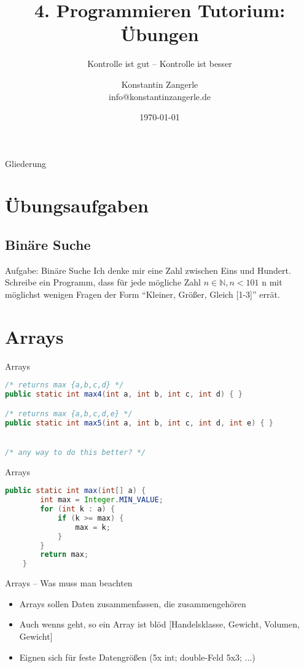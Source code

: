 \documentclass[18pt]{beamer}
\title[Programmieren Tutorium]{4. Programmieren Tutorium:\\ Übungen}
\subtitle{Kontrolle ist gut – Kontrolle ist besser}
\author{Konstantin Zangerle \\ info@konstantinzangerle.de}
\date{\today}
\begin{document}

\begin{frame}
\titlepage
\end{frame}

\begin{frame}{Gliederung}
\tableofcontents
\end{frame}

\section{Übungsaufgaben}
\subsection{Binäre Suche}
\begin{frame}{Aufgabe: Binäre Suche}
Ich denke mir eine Zahl zwischen Eins und Hundert. Schreibe ein Programm, 
dass für jede mögliche Zahl $n \in \mathbb{N}, n <101$ n mit möglichst 
wenigen Fragen der Form ``Kleiner, Größer, Gleich [1-3]'' errät.
\end{frame}



\section{Arrays} %
\begin{frame}[fragile]{Arrays}
\begin{lstlisting}[language=java]
/* returns max {a,b,c,d} */
public static int max4(int a, int b, int c, int d) { } 

/* returns max {a,b,c,d,e} */
public static int max5(int a, int b, int c, int d, int e) { } 


/* any way to do this better? */
\end{lstlisting}
\end{frame}

\begin{frame}[fragile]{Arrays}
 \begin{lstlisting}[language=java]
    public static int max(int[] a) {
        int max = Integer.MIN_VALUE;
        for (int k : a) {
            if (k >= max) {
                max = k;
            }
        }
        return max;
    }
 \end{lstlisting}
\end{frame}

\begin{frame}{Arrays – Was muss man beachten}
 \begin{itemize}
  \item Arrays sollen Daten zusammenfassen, die zusammengehören
  \item Auch wenns geht, so ein Array ist blöd [Handelsklasse, Gewicht, Volumen, Gewicht]
  \item Eignen sich für feste Datengrößen (5x int; double-Feld 5x3; ...)
 \end{itemize}

\end{frame}
\end{document}
